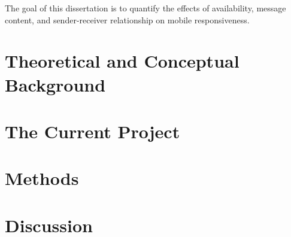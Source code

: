 \documentclass[12pt]{nuthesis}	%
\begin{document}
The goal of this dissertation is to quantify the effects of availability, message content, and sender-receiver relationship on mobile responsiveness. 

\chapter{Theoretical and Conceptual Background}

\chapter{The Current Project}

\chapter{Methods}


\chapter{Discussion}

 \renewcommand\refname{\begin{centering}References\end{centering}}
 




\end{document}
